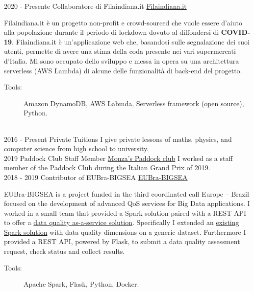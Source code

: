 \documentclass[letterpaper]{twentysecondcvit} %
\begin{document}
\begin{twenty} %
	\twentyitem
	{2020 -}
	{Presente}
	{Collaboratore di Filaindiana.it}
	{\href{https://www.filaindiana.it}{Filaindiana.it}}
	{}
	{
		Filaindiana.it è un progetto non-profit e crowd-sourced che vuole essere d'aiuto alla popolazione durante il periodo di lockdown dovuto al diffondersi di \textbf{COVID-19}. Filaindiana.it è un'applicazione web che, basandosi sulle segnalazione dei suoi utenti, permette di avere una stima della coda presente nei vari supermercati d'Italia. Mi sono occupato dello sviluppo e messa in opera su una architettura serverless (AWS Lambda) di alcune delle funzionalità di back-end del progetto.
		\begin{description}
			\item[Tools:] Amazon DynamoDB, AWS Labmda, Serverless framework (open source), Python.
		\end{description}}
	\\
	\twentyitem
	{2016 -}
	{Present}
	{Private Tuitions}
	{}
	{}
	{I give private lessons of maths, physics, and computer science from high school to university.}
	\\
	\twentyitem
	{2019}
	{}
	{Paddock Club Staff Member}
	{\href{https://tickets.formula1.com/it/h-formula1-hospitality}{Monza's Paddock club}}
	{}
	{I worked as a staff member of the Paddock Club during the Italian Grand Prix of 2019.}
	\\
	\twentyitem
	{2018 -}
	{2019}
	{Contributor of EUBra-BIGSEA}
	{\href{https://www.eubra-bigsea.eu}{EUBra-BIGSEA}}
	{}
	{EUBra-BIGSEA is a project funded in the third coordinated call Europe – Brazil focused on the development of advanced QoS services for Big Data applications. I worked in a small team that provided a Spark solution paired with a REST API to offer a \href{https://www.eubra-bigsea.eu/node/301}{data quality as-a-service solution}. Specifically I extended an \href{https://www.politesi.polimi.it/handle/10589/134468}{existing Spark solution} with data quality dimensions on a generic dataset. Furthermore I provided a REST API, powered by Flask, to submit a data quality assessment request, check status and collect results.
		\begin{description}
			\item[Tools:] Apache Spark, Flask, Python, Docker.
		\end{description}}
\end{twenty}
\end{document}
